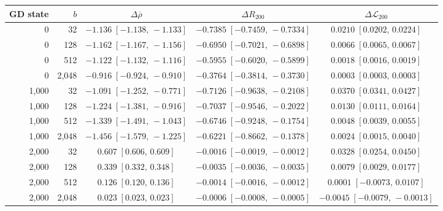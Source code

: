 \begin{tabular}{rrccc}
\hline
GD state & $b$ & $\Delta\overline\rho$ & $\Delta R_{200}$ & $\Delta\mathcal L_{200}$ \\
\hline
0 & 32 & $-1.136\;[-1.138,\,-1.133]$ & $-0.7385\;[-0.7459,\,-0.7334]$ & $0.0210\;[0.0202,\,0.0224]$ \\
0 & 128 & $-1.162\;[-1.167,\,-1.156]$ & $-0.6950\;[-0.7021,\,-0.6898]$ & $0.0066\;[0.0065,\,0.0067]$ \\
0 & 512 & $-1.122\;[-1.132,\,-1.116]$ & $-0.5955\;[-0.6020,\,-0.5899]$ & $0.0018\;[0.0016,\,0.0019]$ \\
0 & 2,048 & $-0.916\;[-0.924,\,-0.910]$ & $-0.3764\;[-0.3814,\,-0.3730]$ & $0.0003\;[0.0003,\,0.0003]$ \\
\hline
1,000 & 32 & $-1.091\;[-1.252,\,-0.771]$ & $-0.7126\;[-0.9638,\,-0.2108]$ & $0.0370\;[0.0341,\,0.0427]$ \\
1,000 & 128 & $-1.224\;[-1.381,\,-0.916]$ & $-0.7037\;[-0.9546,\,-0.2022]$ & $0.0130\;[0.0111,\,0.0164]$ \\
1,000 & 512 & $-1.339\;[-1.491,\,-1.043]$ & $-0.6746\;[-0.9248,\,-0.1754]$ & $0.0048\;[0.0039,\,0.0055]$ \\
1,000 & 2,048 & $-1.456\;[-1.579,\,-1.225]$ & $-0.6221\;[-0.8662,\,-0.1378]$ & $0.0024\;[0.0015,\,0.0040]$ \\
\hline
2,000 & 32 & $0.607\;[0.606,\,0.609]$ & $-0.0016\;[-0.0019,\,-0.0012]$ & $0.0328\;[0.0254,\,0.0450]$ \\
2,000 & 128 & $0.339\;[0.332,\,0.348]$ & $-0.0035\;[-0.0036,\,-0.0035]$ & $0.0079\;[0.0029,\,0.0177]$ \\
2,000 & 512 & $0.126\;[0.120,\,0.136]$ & $-0.0014\;[-0.0016,\,-0.0012]$ & $0.0001\;[-0.0073,\,0.0107]$ \\
2,000 & 2,048 & $0.023\;[0.023,\,0.023]$ & $-0.0006\;[-0.0008,\,-0.0005]$ & $-0.0045\;[-0.0079,\,-0.0013]$ \\
\hline
\end{tabular}
